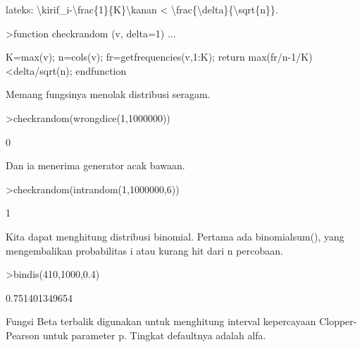 \documentclass[a4paper,10pt]{article}
\begin{document}
\begin{eulernotebook}
\begin{eulercomment}
\begin{eulercomment}
\begin{eulercomment}
lateks: \textbackslash{}kiri\textbar{}f\_i-\textbackslash{}frac\{1\}\{K\}\textbackslash{}kanan\textbar{} \textless{} \textbackslash{}frac\{\textbackslash{}delta\}\{\textbackslash{}sqrt\{n\}\}.
\end{eulercomment}
\begin{eulerprompt}
>function checkrandom (v, delta=1) ...
\end{eulerprompt}
\begin{eulerudf}
    K=max(v); n=cols(v);
    fr=getfrequencies(v,1:K);
    return max(fr/n-1/K)<delta/sqrt(n);
    endfunction
\end{eulerudf}
\begin{eulercomment}
Memang fungsinya menolak distribusi seragam.
\end{eulercomment}
\begin{eulerprompt}
>checkrandom(wrongdice(1,1000000))
\end{eulerprompt}
\begin{euleroutput}
  0
\end{euleroutput}
\begin{eulercomment}
Dan ia menerima generator acak bawaan.
\end{eulercomment}
\begin{eulerprompt}
>checkrandom(intrandom(1,1000000,6))
\end{eulerprompt}
\begin{euleroutput}
  1
\end{euleroutput}
\begin{eulercomment}
Kita dapat menghitung distribusi binomial. Pertama ada binomialsum(),
yang mengembalikan probabilitas i atau kurang hit dari n percobaan.
\end{eulercomment}
\begin{eulerprompt}
>bindis(410,1000,0.4)
\end{eulerprompt}
\begin{euleroutput}
  0.751401349654
\end{euleroutput}
\begin{eulercomment}
Fungsi Beta terbalik digunakan untuk menghitung interval kepercayaan
Clopper-Pearson untuk parameter p. Tingkat defaultnya adalah alfa.


\end{eulercomment}
\end{eulercomment}
\end{eulercomment}
\end{eulernotebook}
\end{document}
